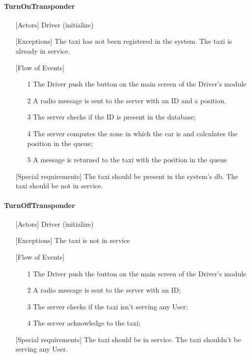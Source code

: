 \documentclass[12pt,a4paper]{book}
\begin{document}
			\paragraph{TurnOnTransponder}
			\begin{itemize}
				\item[\textbullet] [Actors] Driver (initialize)
				\item[\textbullet] [Exceptions] The taxi has not been registered in the system. The taxi is already in service.
				\item[\textbullet] [Flow of Events]
				\begin{itemize}
					\item[1] The Driver push the button on the main screen of the Driver's module
					\item[2] A radio message is sent to the server with an ID and a position.
					\item[3] The server checks if the ID is present in the database;
					\item[4] The server computes the zone in which the car is and calculates the position in the queue;
					\item[5] A message is returned to the taxi with the position in the queue
				\end{itemize}
				\item[\textbullet] [Special requirements] The taxi should be present in the system's db. The taxi should be not in service.
			\end{itemize}
			\paragraph{TurnOffTransponder}
			\begin{itemize}
				\item[\textbullet] [Actors] Driver (initialize)
				\item[\textbullet] [Exceptions] The taxi is not in service
				\item[\textbullet] [Flow of Events]
				\begin{itemize}
					\item[1] The Driver push the button on the main screen of the Driver's module
					\item[2] A radio message is sent to the server with an ID;
					\item[3] The server checks if the taxi isn't serving any User;
					\item[4] The server acknowledge to the taxi;
				\end{itemize}
				\item[\textbullet] [Special requirements] The taxi should be in service. The taxi shouldn't be serving any User.
			\end{itemize}
\end{document}
